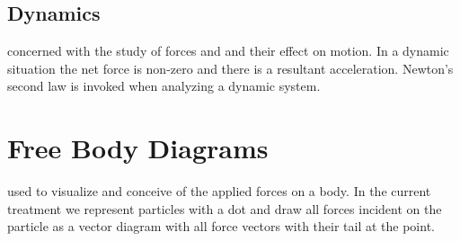 \subsection{Dynamics} 
 concerned with the study of forces and and their effect on motion.  In a dynamic situation the net force is non-zero and there is a resultant acceleration.  Newton's second law is invoked when analyzing a dynamic system. 



\section{Free Body Diagrams}
 used to visualize and conceive of the applied forces on a body.  In the current treatment we represent particles with a dot and draw all forces incident on the particle as a vector diagram with all force vectors with their tail at the point.  



